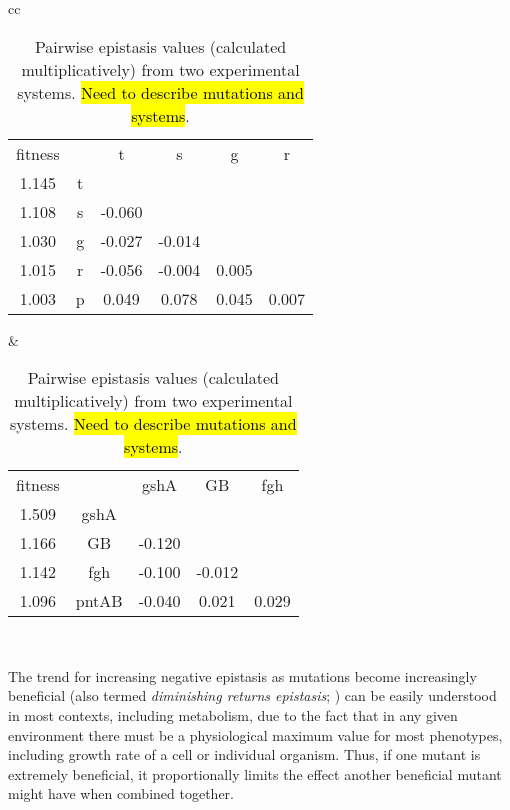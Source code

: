 \begin{table}
\newcommand{\hlB}{\cellcolor{blue!20}}
\newcommand{\hlR}{\cellcolor{red!20}}
\centering
\begin{tabular}{cc}
\begin{subtable}[b]{0.5\textwidth}
\caption{\citet{Khan2011}}
\begin{tabular}{cccccc}
fitness &   & t           & s           & g           & r           \\
1.145   & t &             &             &             &             \\
1.108   & s & \hlB -0.060 &             &             &             \\
1.030   & g & \hlB -0.027 & \hlB -0.014 &             &             \\
1.015   & r & \hlB -0.056 & \hlB -0.004 & \hlR 0.005  &             \\
1.003   & p & \hlR  0.049 & \hlR  0.078 & \hlR 0.045  & \hlR 0.007  \\
\end{tabular}
\end{subtable}
&
\begin{subtable}[b]{0.5\textwidth}
\caption{\citet{Chou2011}}
\begin{tabular}{ccccc}
fitness &       & gshA        & GB          & fgh         \\
1.509   & gshA  &             &             &             \\
1.166   & GB    & \hlB -0.120 &             &             \\
1.142   & fgh   & \hlB -0.100 & \hlB -0.012 &             \\
1.096   & pntAB & \hlB -0.040 & \hlR  0.021 & \hlR 0.029  \\
\end{tabular}
\end{subtable}
\\
\end{tabular}
\caption{Pairwise epistasis values (calculated multiplicatively) from 
two experimental systems. \hl{Need to describe mutations and systems}.}
\label{tab:pairwiseBeneEpi}
\end{table}


The trend for increasing negative epistasis as mutations become
increasingly beneficial (also termed \textit{diminishing returns
epistasis}; \citep{Chou2011}) can be easily understood in most
contexts, including metabolism, due to the fact that in any given
environment there must be a physiological maximum value for most
phenotypes, including growth rate of a cell or individual organism.
Thus, if one mutant is extremely beneficial, it proportionally limits
the effect another beneficial mutant might have when combined
together.


